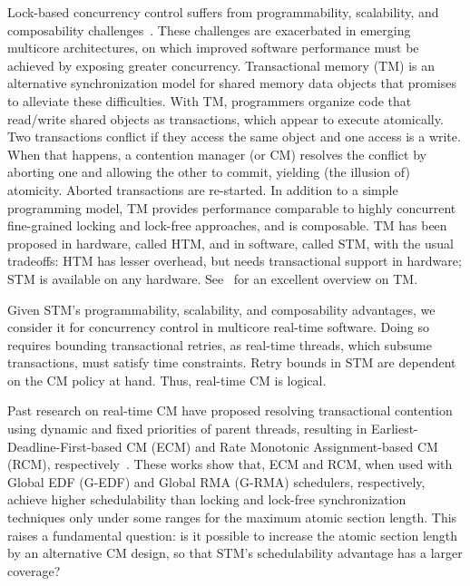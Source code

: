 \documentclass[conference]{IEEEtran}
\begin{document}
Lock-based concurrency control suffers from programmability, scalability, and composability challenges~\cite{Herlihy:2006:AMP:1146381.1146382}. These challenges are exacerbated in emerging multicore architectures, on which improved software performance must be achieved by exposing greater concurrency.  Transactional memory (TM) is an alternative synchronization model for shared memory data objects that promises to alleviate these difficulties.  With TM, programmers organize code that read/write shared objects as transactions, which appear to execute atomically. Two transactions conflict if they access the same object and one access is a write. When that happens, a contention manager (or CM)
resolves the conflict by aborting one and allowing the other to commit, yielding (the illusion of) atomicity. Aborted transactions are re-started.
In addition to a simple programming model, TM provides performance comparable to highly concurrent fine-grained locking and lock-free approaches,  
and is composable. 
TM has been proposed in hardware, called HTM,  
and in software, called STM,  
with the usual tradeoffs: HTM has lesser overhead, but needs transactional support in hardware; STM is available on any hardware. See~\cite{tm-book10} for an excellent overview on TM.


Given STM's programmability, scalability, and composability advantages, we consider it for concurrency control in multicore real-time software. Doing so requires bounding transactional  retries, as real-time threads, which subsume transactions, must satisfy time constraints.  Retry bounds in STM are dependent on the CM policy at hand. Thus, real-time CM is logical.

Past research on real-time CM have proposed resolving transactional contention using dynamic and fixed priorities of parent threads, resulting in Earliest-Deadline-First-based CM (ECM) and Rate Monotonic Assignment-based CM (RCM), respectively~\cite{fahmy2009bounding,fahmy2009response,stmconcurrencycontrol:emsoft11}.
These works show that, ECM and RCM, when used with Global EDF (G-EDF) and Global RMA  (G-RMA) schedulers, respectively, achieve higher schedulability than locking and lock-free synchronization techniques only under some ranges for the maximum atomic section length. This raises a fundamental question: is it possible to increase the atomic section length by an alternative CM design, so that STM's schedulability advantage has a larger coverage? 
\end{document}

